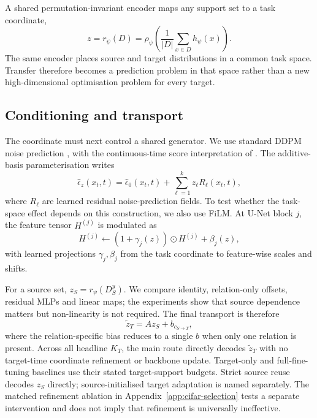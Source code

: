 \documentclass{article}
\newcommand{\KT}{K_T}
\newcommand{\epshat}{\widehat{\epsilon}}
\begin{document}
A shared permutation-invariant encoder maps any support set to a task coordinate,
\begin{equation}
z=r_\psi(D)=\rho_\psi\!\left(\frac{1}{|D|}\sum_{x\in D}h_\psi(x)\right).
\label{eq:encoder}
\end{equation}
The same encoder places source and target distributions in a common task space. Transfer therefore becomes a prediction problem in that space rather than a new high-dimensional optimisation problem for every target.

\subsection{Conditioning and transport}
The coordinate must next control a shared generator. We use standard DDPM noise prediction \citep{ho2020ddpm}, with the continuous-time score interpretation of \citet{song2021score}. The additive-basis parameterisation writes
\begin{equation}
\epshat_z(x_t,t)=\epshat_0(x_t,t)+\sum_{\ell=1}^{k}z_\ell R_\ell(x_t,t),
\label{eq:basis}
\end{equation}
where $R_\ell$ are learned residual noise-prediction fields. To test whether the task-space effect depends on this construction, we also use FiLM. At U-Net block $j$, the feature tensor $H^{(j)}$ is modulated as
\[
H^{(j)}\leftarrow(1+\gamma_j(z))\odot H^{(j)}+\beta_j(z),
\]
with learned projections $\gamma_j,\beta_j$ from the task coordinate to feature-wise scales and shifts.

For a source set, $z_S=r_\psi(D_S^y)$. We compare identity, relation-only offsets, residual MLPs and linear maps; the experiments show that source dependence matters but non-linearity is not required. The final transport is therefore
\begin{equation}
\widetilde z_T=A z_S+b_{c_{S\rightarrow T}},
\label{eq:transport}
\end{equation}
where the relation-specific bias reduces to a single $b$ when only one relation is present. Across all headline $\KT$, the main route directly decodes $\widetilde z_T$ with no target-time coordinate refinement or backbone update. Target-only and full-fine-tuning baselines use their stated target-support budgets. Strict source reuse decodes $z_S$ directly; source-initialised target adaptation is named separately. The matched refinement ablation in Appendix~\ref{app:cifar-selection} tests a separate intervention and does not imply that refinement is universally ineffective.
\end{document}

